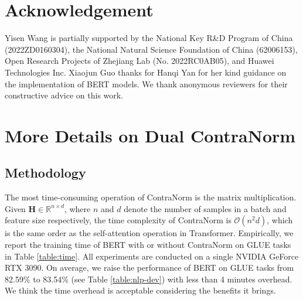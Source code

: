 \documentclass{article}
\theoremstyle{definition}
\theoremstyle{remark}
\theoremstyle{theorem}
\begin{document}
\section*{Acknowledgement}
Yisen Wang is partially supported by the National Key R\&D Program of China (2022ZD0160304), the National Natural Science Foundation of China (62006153), Open Research Projects of Zhejiang Lab (No. 2022RC0AB05), and Huawei Technologies Inc. Xiaojun Guo thanks for Hanqi Yan for her kind guidance on the implementation of BERT models. We thank anonymous reviewers for their constructive advice on this work. 





\newpage

\appendix 


\section{More Details on Dual ContraNorm} \label{appen:time}

\subsection{Methodology}

The most time-consuming operation of ContraNorm is the matrix multiplication. Given $\mathbf{H} \in {\mathbb{R}^{n \times d}}$, where $n$ and $d$ denote the number of samples in a batch and feature size respectively, the time complexity of ContraNorm is $\mathcal{O}(n^2d)$, which is the same order as the self-attention operation in Transformer. Empirically, we report the training time of BERT with or without ContraNorm on GLUE tasks in Table \ref{table:time}. All experiments are conducted on a single NVIDIA GeForce RTX 3090. On average, we raise the performance of BERT on GLUE tasks from 82.59\% to 83.54\% (see Table \ref{table:nlp-dev}) with less than 4 minutes overhead. We think the time overhead is acceptable considering the benefits it brings. 

\begin{table}[h]
	\centering
	\caption{Estimated training time of BERT with or without ContraNorm on GLUE tasks. All experiments are conducted on a single NVIDIA GeForce RTX 3090. $s$ is the abbreviation for second. \textbf{Avg} denotes the average training time across all the tasks.} 
	\label{table:time}
\end{table}
\end{document}

